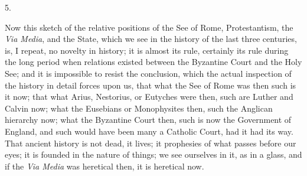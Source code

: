 5.

Now this sketch of the relative positions of the See of Rome,
Protestantism, the \emph{Via Media}, and the State, which we see in
the history of the last three centuries, is, I repeat, no novelty in
history; it is almost its rule, certainly its rule during the long
period when relations existed between the Byzantine Court and the Holy
See; and it is impossible to resist the conclusion, which the actual
inspection of the history in detail forces upon us, that what the See
of Rome was then such is it now; that what Arius, Nestorius, or
Eutyches were then, such are Luther and Calvin now; what the Eusebians
or Monophysites then, such the Anglican hierarchy now; what the
Byzantine Court then, such is now the Government of England, and such
would have been many a Catholic Court, had it had its way. That
ancient history is not dead, it lives; it prophesies of what passes
before our eyes; it is founded in the nature of things; we see
ourselves in it, as in a glass, and if the \emph{Via Media} was
heretical then, it is heretical now.

